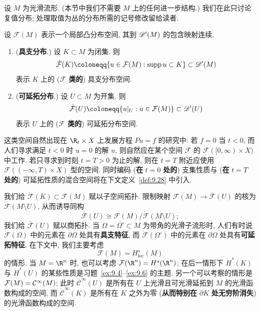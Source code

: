 设 $M$ 为光滑流形. (本节中我们不需要 $M$ 上的任何进一步结构.) 我们在此只讨论复值分布; 处理取值为丛的分布所需的记号修改留给读者.

\begin{definition}[具支分布与可延拓分布]\label{def:9.20}
设 $\mathcal{F}(M)$ 表示一个局部凸分布空间, 其到 $\mathscr{D}'(M)$ 的包含映射连续.
\begin{enumerate}
    \item (\textbf{具支分布}.) 设 $K \subset M$ 为闭集. 则
    \begin{equation}\label{eq:9.64}
        \dot{\mathcal{F}}(K) \defeq \{u \in \mathcal{F}(M) : \operatorname{supp} u \subset K\} \subset \Distr(M)
    \end{equation}
    表示 $K$ 上的 (\textbf{$\mathcal{F}$ 类的}) 具支分布空间.
    \item (\textbf{可延拓分布}.) 设 $U \subset M$ 为开集. 则
    \begin{equation}\label{eq:9.65}
        \bar{\mathcal{F}}(U) \defeq \{u|_U : u \in \mathcal{F}(M)\} \subset \Distr(U)
    \end{equation}
    表示 $U$ 上的 (\textbf{$\mathcal{F}$ 类的}) 可延拓分布空间.
\end{enumerate}
\end{definition}

这类空间自然出现在 $\R_t \times X$ 上发展方程 $P u = f$ 的研究中: 若 $f = 0$ 当 $t < 0$, 而人们寻求满足 $t < 0$ 时 $u = 0$ 的解 $u$, 则自然应在某个空间 $\mathcal{F}$ 的 $\dot{\mathcal{F}}([0, \infty) \times X)$ 中工作. 若只寻求到时刻 $t = T > 0$ 为止的解, 则在 $t = T$ 附近应使用 $\mathcal{F}((-\infty, T) \times X)$ 型的空间. 同时编码 (\textbf{在} $t = 0$ \textbf{处的}) 支集性质与 (\textbf{在} $t = T$ \textbf{处的}) 可延拓性质的混合空间将在下文定义~\ref{def:9.28} 中引入.

我们给 $\dot{\mathcal{F}}(K) \subset \mathcal{F}(M)$ 赋以子空间拓扑. 限制映射 $\mathcal{F}(M) \to \bar{\mathcal{F}}(U)$ 的核为 $\dot{\mathcal{F}}(M \setminus U)$, 从而诱导同构
\begin{equation}\label{eq:9.66}
    \bar{\mathcal{F}}(U) \cong \mathcal{F}(M) / \dot{\mathcal{F}}(M \setminus U);
\end{equation}
我们给 $\bar{\mathcal{F}}(U)$ 赋以商拓扑. 当 $\Omega = \overline{\Omega^\circ} \subset M$ 为带角的光滑子流形时, 人们有时说 $\dot{\mathcal{F}}(\Omega)$ 中的元素在 $\partial \Omega$ 处具有\textbf{具支特征}, 而 $\dot{\mathcal{F}}(\Omega^\circ)$ 中的元素在 $\partial \Omega$ 处具有\textbf{可延拓特征}. 在下文中, 我们主要考虑
\begin{equation}\label{eq:9.67}
    \mathcal{F}(M) = H_{\mathrm{loc}}^s(M)
\end{equation}
的情形. 当 $M = \R^n$ 时, 也可以考虑 $\mathcal{F}(\R^n) = H^s(\R^n)$; 在后一情形下 $\dot{H}^s(K)$ 与 $\dot{H}^s(U)$ 的某些性质是习题~\ref{ex:9.4}--\ref{ex:9.6} 的主题. 另一个可以考察的情形是 $\mathcal{F}(M) = \mathcal{C}^\infty(M)$; 此时 $\bar{\mathcal{C}}^\infty(U)$ 是所有在 $U$ 上光滑且可光滑延拓到 $M$ 的光滑函数构成的空间, 而 $\dot{\mathcal{C}}^\infty(K)$ 是所有在 $K$ 之外为零 (\textbf{从而特别在} $\partial K$ \textbf{处无穷阶消失}) 的光滑函数构成的空间.

